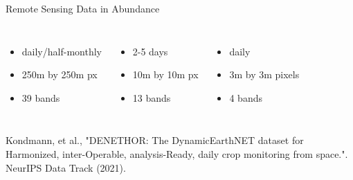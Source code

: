 \documentclass[11pt]{beamer}
\newcommand{\citeapa}[1]{ {\tiny#1\par} }
\begin{document}
\begin{frame}{Remote Sensing Data in Abundance}
		\vspace{1em}
		\small
	
		\begin{columns}
			\begin{itemize}
				\item daily/half-monthly
				\item 250m by 250m px
				\item 39 bands
			\end{itemize}	
			\begin{itemize}
				\item 2-5 days
				\item 10m by 10m px
				\item 13 bands
			\end{itemize}
			\begin{itemize}
				\item daily
				\item 3m by 3m pixels
				\item 4 bands
			\end{itemize}

	\end{columns}
	
		\vspace{3mm}
		\citeapa{Kondmann, et al., "DENETHOR: The DynamicEarthNET dataset for Harmonized, inter-Operable, analysis-Ready, daily crop monitoring from space.". NeurIPS Data Track (2021).}
	\end{frame}
\end{document}
